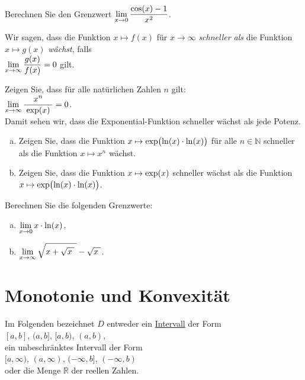 \exercise
Berechnen Sie den Grenzwert \quad $\displaystyle\lim\limits_{x \rightarrow 0} \frac{\cos(x) - 1}{x^2}$. \eox


\begin{Definition} \lb
  Wir sagen, dass die Funktion $x \mapsto f(x)$ f\"ur $x \rightarrow \infty$ \emph{schneller als} die
  Funktion $x \mapsto g(x)$ \emph{w\"achst}, falls 
  \\[0.2cm]
  \hspace*{1.3cm}
  $\displaystyle \lim\limits_{x \rightarrow \infty} \frac{g(x)}{f(x)} = 0$ \quad gilt. \eox
\end{Definition}

\exercise
Zeigen Sie, dass f\"ur alle nat\"urlichen Zahlen $n$ gilt: 
\\[0.3cm]
\hspace*{1.3cm} $\lim\limits_{x \rightarrow \infty} \displaystyle\frac{\;\displaystyle x^n\;}{\;\displaystyle\exp(x)\;} = 0$.
\\[0.3cm]
Damit sehen wir, dass die Exponential-Funktion schneller w\"achst als jede Potenz.  
\eox

\exercise
\begin{enumerate}[(a)]
\item Zeigen Sie, dass die Funktion $\displaystyle x \mapsto \exp\bigl(\ln(x) \cdot \ln(x)\bigr)$ f\"ur alle $n \in \mathbb{N}$ schneller
      als die Funktion $x \mapsto x^n$ w\"achst.
\item Zeigen Sie, dass die Funktion $\displaystyle x \mapsto \exp(x)$ schneller w\"achst als die Funktion
      $\displaystyle x \mapsto \exp\bigl(\ln(x) \cdot \ln(x)\bigr)$. \eox
\end{enumerate} 

\exercise
Berechnen Sie die folgenden Grenzwerte:
\begin{enumerate}[(a)]
\item $\displaystyle\lim\limits_{x \rightarrow 0} x \cdot \ln(x)$,
\item $\displaystyle\lim\limits_{x \rightarrow \infty} \sqrt{x + \sqrt{x\;}\;} - \sqrt{x\;}$.  \eox
\end{enumerate}

\section{Monotonie und Konvexit\"at}
Im Folgenden bezeichnet $D$ entweder ein
\href{http://de.wikipedia.org/wiki/Intervall_(Mathematik)}{Intervall} der Form
\\[0.2cm]
\hspace*{1.3cm}
$[a, b]$, \quad  
$(a, b]$, \quad   
$[a, b)$, \quad    
$(a, b)$,
\\[0.2cm]
ein unbeschr\"anktes Intervall der Form
\\[0.2cm]
\hspace*{1.3cm}
$[a, \infty)$, \quad      
$(a, \infty)$, \quad       
$(-\infty, b]$, \quad        
$(-\infty, b)$ \quad        
\\[0.2cm]
oder die Menge $\mathbb{R}$ der reellen Zahlen.

